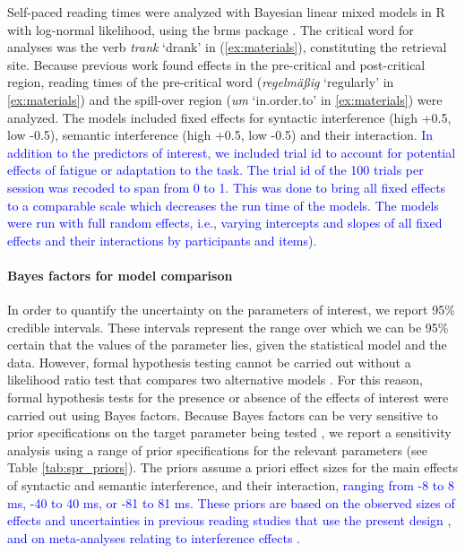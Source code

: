 \documentclass[a4paper, man, floatsintext]{apa7}
\begin{document}
Self-paced reading times were analyzed with Bayesian linear mixed models in R \citep{r} with log-normal likelihood, using the brms package \citep{brms}. The critical word for analyses was the verb \textit{trank} `drank' in (\ref{ex:materials}), constituting the retrieval site. Because previous work found effects in the pre-critical and post-critical region, reading times of the pre-critical word (\textit{regelmäßig} `regularly' in \ref{ex:materials}) and the spill-over region (\textit{um} `in.order.to' in \ref{ex:materials}) were analyzed. 
The models included fixed effects for syntactic interference (high +0.5, low -0.5), semantic interference (high +0.5, low -0.5) and their interaction. \textcolor{blue}{In addition to the predictors of interest, we included trial id to account for potential effects of fatigue or adaptation to the task. The trial id of the 100 trials per session was recoded to span from 0 to 1. This was done to bring all fixed effects to a comparable scale which decreases the run time of the models. The models were run with full random effects, i.e., varying intercepts and slopes of all fixed effects and their interactions by participants and items).}  

\paragraph{Bayes factors for model comparison}\label{BF_analysis_SPR}

In order to quantify the uncertainty on the parameters of interest, we report 95\% credible intervals. These intervals represent the range over which we can be 95\% certain that the values of the parameter lies, given the statistical model and the data. However, formal hypothesis testing cannot be carried out without a likelihood ratio test that compares two alternative models \parencite{schad_etal_2022_BF,Royall}. For this reason, formal hypothesis tests for the presence or absence of the effects of interest were carried out using Bayes factors. Because Bayes factors can be very sensitive to prior specifications on the target parameter being tested \parencite{schad_etal_2022_BF}, 
we report a sensitivity analysis using a range of prior specifications for the relevant parameters (see Table \ref{tab:spr_priors}). The priors assume a priori effect sizes for the main effects of syntactic and semantic interference, and their interaction, \textcolor{blue}{ranging from -8 to 8 ms, -40 to 40 ms, or -81 to 81 ms. These priors are based on the observed sizes of effects and uncertainties in previous reading studies that use the present design \parencite{vandyke07,mertzen}, and on meta-analyses relating to interference effects \parencite{jaeger_etal_2017}.} 
\end{document}
